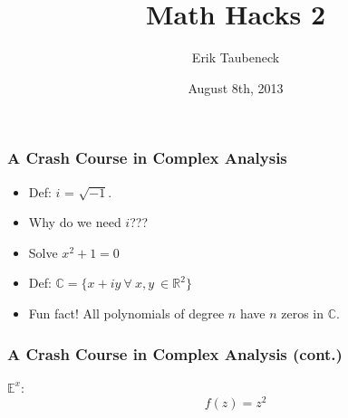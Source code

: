 \documentclass[10pt]{beamer}
\title{
{\bf{\textsf{Math Hacks 2}}}}
\author[Erik Taubeneck]{Erik Taubeneck}
\institute[Hacker School - Summer 2013] 
{
{\tt erik.taubeneck@gmail.com}
}
\date{August 8th, 2013}
\def\R{\mathbb{R}}                     %
\def\C{\mathbb{C}}                     %
\begin{document}
\begin{frame}
  \titlepage
\end{frame}



\begin{frame}
\frametitle{A Crash Course in Complex Analysis}

\begin{itemize}[<+->]
  \item Def: $i$ = $\sqrt{-1}$.
  \item Why do we need $i$???
  \item Solve $x^2 + 1 = 0$
  \item Def: $\C = \{x + iy \ \forall \ x,y \ \in \R^2 \}$
  \item Fun fact! All polynomials of degree $n$ have $n$ zeros in $\C$.
\end{itemize}


\end{frame}

\begin{frame}
\frametitle{A Crash Course in Complex Analysis (cont.)}

$\mathbb{E}^x$:
\[ f(z) = z^2 \]
\pause {}

\pause {}
\pause {}
\end{frame}
\end{document}

